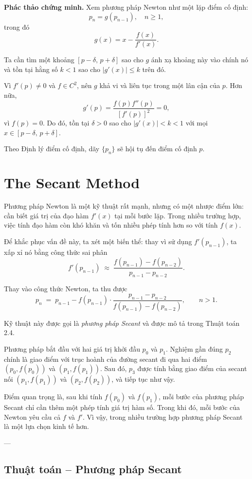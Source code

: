 \textbf{Phác thảo chứng minh.}  
Xem phương pháp Newton như một lặp điểm cố định:
\[
p_n = g(p_{n-1}), \quad n \geq 1,
\]
trong đó
\[
g(x) = x - \frac{f(x)}{f'(x)}.
\]

Ta cần tìm một khoảng $[p-\delta,\,p+\delta]$ sao cho $g$ ánh xạ khoảng này vào chính nó 
và tồn tại hằng số $k < 1$ sao cho $|g'(x)| \leq k$ trên đó.

Vì $f'(p) \neq 0$ và $f \in C^2$, nên $g$ khả vi và liên tục trong một lân cận của $p$. 
Hơn nữa,
\[
g'(p) = \frac{f(p)f''(p)}{[f'(p)]^2} = 0,
\]
vì $f(p) = 0$. Do đó, tồn tại $\delta > 0$ sao cho $|g'(x)| < k < 1$ 
với mọi $x \in [p-\delta,\,p+\delta]$.

Theo Định lý điểm cố định, dãy $\{p_n\}$ sẽ hội tụ đến điểm cố định $p$.

\section*{\textbf{The Secant Method}}

Phương pháp Newton là một kỹ thuật rất mạnh, nhưng có một nhược điểm lớn: 
cần biết giá trị của đạo hàm $f'(x)$ tại mỗi bước lặp. 
Trong nhiều trường hợp, việc tính đạo hàm còn khó khăn và tốn nhiều phép tính hơn so với tính $f(x)$.

Để khắc phục vấn đề này, ta xét một biến thể: thay vì sử dụng $f'(p_{n-1})$, 
ta xấp xỉ nó bằng công thức sai phân
\[
f'(p_{n-1}) \;\approx\; \frac{f(p_{n-1}) - f(p_{n-2})}{p_{n-1} - p_{n-2}}.
\]

Thay vào công thức Newton, ta thu được
\[
p_n \;=\; p_{n-1} - f(p_{n-1}) \cdot \frac{p_{n-1} - p_{n-2}}{f(p_{n-1}) - f(p_{n-2})}, 
\qquad n > 1. \tag{2.12}
\]

Kỹ thuật này được gọi là \textit{phương pháp Secant} và được mô tả trong Thuật toán 2.4.

Phương pháp bắt đầu với hai giá trị khởi đầu $p_0$ và $p_1$. 
Nghiệm gần đúng $p_2$ chính là giao điểm với trục hoành của đường secant đi qua hai điểm 
$(p_0, f(p_0))$ và $(p_1, f(p_1))$. 
Sau đó, $p_3$ được tính bằng giao điểm của secant nối $(p_1, f(p_1))$ và $(p_2, f(p_2))$, 
và tiếp tục như vậy. 

Điểm quan trọng là, sau khi tính $f(p_0)$ và $f(p_1)$, 
mỗi bước của phương pháp Secant chỉ cần thêm một phép tính giá trị hàm số. 
Trong khi đó, mỗi bước của Newton yêu cầu cả $f$ và $f'$. 
Vì vậy, trong nhiều trường hợp phương pháp Secant là một lựa chọn kinh tế hơn.

---

\subsection*{\textbf{Thuật toán – Phương pháp Secant}}


